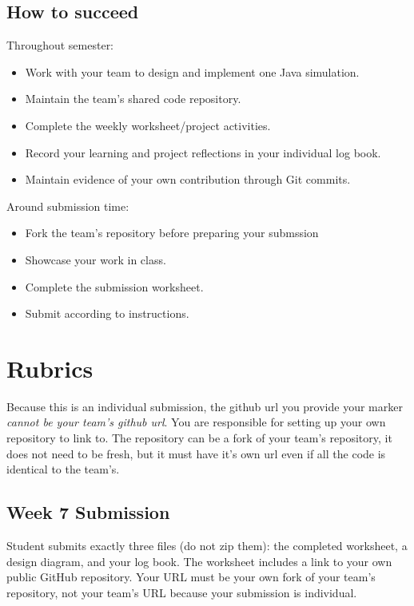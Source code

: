 \documentclass[twoside=false,DIV=14]{scrartcl}
\begin{document}
\subsection*{How to succeed}
Throughout semester:\begin{itemize}
  \item Work with your team to design and implement one Java simulation.
  \item Maintain the team's shared code repository.
  \item Complete the weekly worksheet/project activities.
  \item Record your learning and project reflections in your individual log book.
  \item Maintain evidence of your own contribution through Git commits.
\end{itemize}
Around submission time:\begin{itemize}
  \item Fork the team's repository before preparing your submssion
  \item Showcase your work in class.
  \item Complete the submission worksheet.
  \item Submit according to instructions.
\end{itemize}

\section*{Rubrics}

\begin{note}
	Because this is an individual submission, the github url you provide your marker \emph{cannot be your team's github url}.  You are responsible for setting up your own repository to link to.  The repository can be a fork of your team's repository, it does not need to be fresh, but it must have it's own url even if all the code is identical to the team's.
\end{note}

\subsection*{Week 7 Submission}
Student submits exactly three files (do not zip them): the completed worksheet, a design diagram, and your log book.  The worksheet includes a link to your own public GitHub repository.  Your URL must be your own fork of your team's repository, not your team's URL because your submission is individual.
\end{document}
